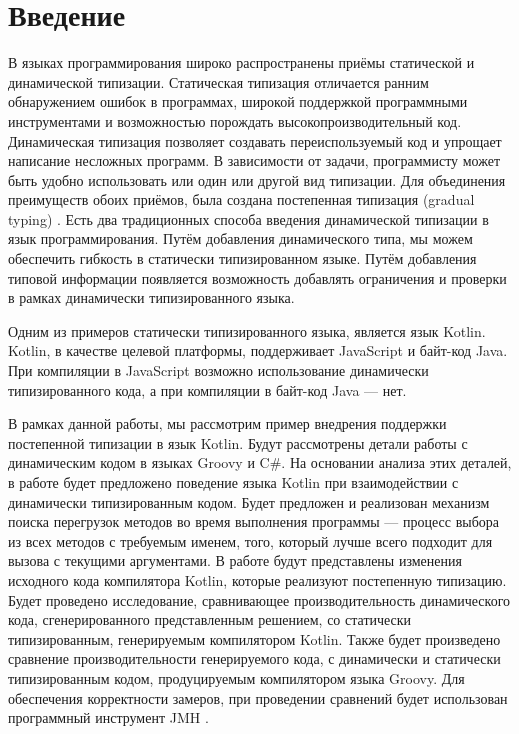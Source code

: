 \section*{Введение}

В языках программирования широко распространены приёмы статической и динамической типизации. Статическая типизация отличается ранним обнаружением ошибок в программах, широкой поддержкой программными инструментами и возможностью порождать высокопроизводительный код. Динамическая типизация позволяет создавать переиспользуемый код и упрощает написание несложных программ. 
В зависимости от задачи, программисту может быть удобно использовать или один или другой вид типизации. Для объединения преимуществ обоих приёмов, была создана постепенная типизация (gradual typing) \cite{gradual:siek2006gradual}. Есть два традиционных способа введения динамической типизации в язык программирования. Путём добавления динамического типа, мы можем обеспечить гибкость в статически типизированном языке. Путём добавления типовой информации появляется возможность добавлять ограничения и проверки в рамках динамически типизированного языка.

Одним из примеров статически типизированного языка, является язык Kotlin. 
Kotlin, в качестве целевой платформы, поддерживает JavaScript и байт-код Java. При компиляции в JavaScript возможно использование динамически типизированного кода, а при компиляции в байт-код Java --- нет.

В рамках данной работы, мы рассмотрим пример внедрения поддержки постепенной типизации в язык Kotlin. Будут рассмотрены детали работы с динамическим кодом в языках Groovy и C\#. На основании анализа этих деталей, в работе будет предложено поведение языка Kotlin при взаимодействии с динамически типизированным кодом. Будет предложен и реализован механизм поиска перегрузок методов во время выполнения программы --- процесс выбора из всех методов с требуемым именем, того, который лучше всего подходит для вызова с текущими аргументами. В работе будут представлены изменения исходного кода компилятора Kotlin, которые реализуют постепенную типизацию. Будет проведено исследование, сравнивающее производительность динамического кода, сгенерированного представленным решением, со статически типизированным, генерируемым компилятором Kotlin. Также будет произведено сравнение производительности генерируемого кода, с динамически и статически типизированным кодом, продуцируемым компилятором языка Groovy. Для обеспечения корректности замеров, при проведении сравнений будет использован программный инструмент JMH \cite{java:jmh}.



